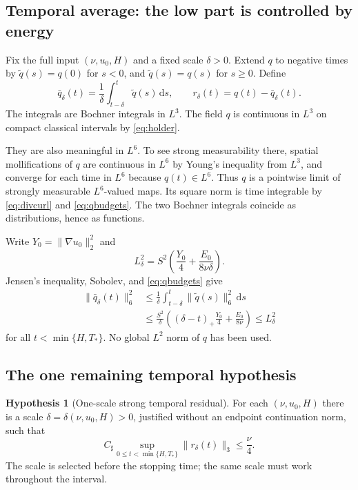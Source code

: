 \documentclass[11pt,a4paper]{article}
\theoremstyle{definition}\newtheorem{definition}[theorem]{Definition}
\newtheorem{hypothesis}[theorem]{Hypothesis}
\theoremstyle{remark}\newtheorem{remark}[theorem]{Remark}
\newcommand{\dd}{\,\mathrm d}
\newcommand{\norm}[1]{\lVert #1\rVert}
\numberwithin{equation}{section}
\begin{document}
\subsection{Temporal average: the low part is controlled by energy}
Fix the full input $(\nu,u_0,H)$ and a fixed scale $\delta>0$. Extend $q$ to negative times by $\widetilde q(s)=q(0)$ for $s<0$, and $\widetilde q(s)=q(s)$ for $s\ge0$. Define
\begin{equation}\label{eq:average}
 \bar q_\delta(t)=\frac1\delta\int_{t-\delta}^{t}\widetilde q(s)\dd s,
 \qquad r_\delta(t)=q(t)-\bar q_\delta(t).
\end{equation}
The integrals are Bochner integrals in $L^3$. The field $q$ is continuous in $L^3$ on compact classical intervals by \eqref{eq:holder}.

They are also meaningful in $L^6$. To see strong measurability there, spatial mollifications of $q$ are continuous in $L^6$ by Young's inequality from $L^3$, and converge for each time in $L^6$ because $q(t)\in L^6$. Thus $q$ is a pointwise limit of strongly measurable $L^6$-valued maps. Its square norm is time integrable by \eqref{eq:divcurl} and \eqref{eq:qbudgets}. The two Bochner integrals coincide as distributions, hence as functions.

Write $Y_0=\norm{\nabla u_0}_2^2$ and
\begin{equation}\label{eq:Ldelta}
 L_\delta^2=S^2\left(\frac{Y_0}{4}+\frac{E_0}{8\nu\delta}\right).
\end{equation}
Jensen's inequality, Sobolev, and \eqref{eq:qbudgets} give
\begin{align}
 \norm{\bar q_\delta(t)}_6^2
 &\le\frac1\delta\int_{t-\delta}^{t}\norm{\widetilde q(s)}_6^2\dd s\nonumber\\
 &\le\frac{S^2}{\delta}
 \left((\delta-t)_+\frac{Y_0}{4}+\frac{E_0}{8\nu}\right)
 \le L_\delta^2\label{eq:averageL6}
\end{align}
for all $t<\min\{H,T_*\}$. No global $L^2$ norm of $q$ has been used.

\subsection{The one remaining temporal hypothesis}
\begin{hypothesis}[One-scale strong temporal residual]\label{hyp:temporal}
For each $(\nu,u_0,H)$ there is a scale $\delta=\delta(\nu,u_0,H)>0$, justified without an endpoint continuation norm, such that
\begin{equation}\label{eq:residualsmall}
 C_\sharp\sup_{0\le t<\min\{H,T_*\}}\norm{r_\delta(t)}_3
 \le\frac\nu4.
\end{equation}
The scale is selected before the stopping time; the same scale must work throughout the interval.
\end{hypothesis}
\end{document}

